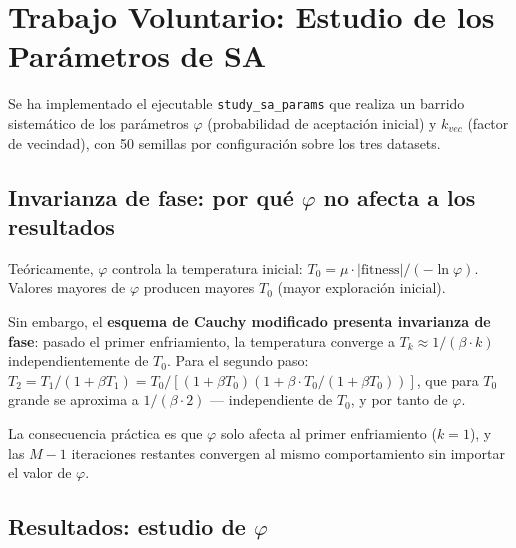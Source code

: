\documentclass[12pt,a4paper]{article}
\begin{document}
\section{Trabajo Voluntario: Estudio de los Parámetros de SA}

Se ha implementado el ejecutable \texttt{study\_sa\_params} que realiza un barrido
sistemático de los parámetros $\varphi$ (probabilidad de aceptación inicial) y
$k_{vec}$ (factor de vecindad), con 50 semillas por configuración sobre los tres datasets.

\subsection{Invarianza de fase: por qué $\varphi$ no afecta a los resultados}

Teóricamente, $\varphi$ controla la temperatura inicial:
$T_0 = \mu \cdot |\text{fitness}| / (-\ln\varphi)$.
Valores mayores de $\varphi$ producen mayores $T_0$ (mayor exploración inicial).

Sin embargo, el \textbf{esquema de Cauchy modificado presenta invarianza de fase}:
pasado el primer enfriamiento, la temperatura converge a
$T_k \approx 1/(\beta \cdot k)$ independientemente de $T_0$.
Para el segundo paso:
$T_2 = T_1/(1+\beta T_1) = T_0/[(1+\beta T_0)(1+\beta \cdot T_0/(1+\beta T_0))]$,
que para $T_0$ grande se aproxima a $1/(\beta \cdot 2)$ — independiente de $T_0$, y
por tanto de $\varphi$.

La consecuencia práctica es que $\varphi$ solo afecta al primer enfriamiento ($k=1$), y
las $M-1$ iteraciones restantes convergen al mismo comportamiento sin importar
el valor de $\varphi$.

\subsection{Resultados: estudio de $\varphi$}
\end{document}
